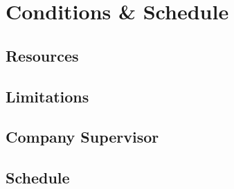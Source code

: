 \documentclass{../kththesis}
\begin{document}
\chapter{Conditions \& Schedule}

\section{Resources}

\section{Limitations}

\section{Company Supervisor}

\section{Schedule}



\printbibliography[heading=bibintoc] %

\appendix
\end{document}
